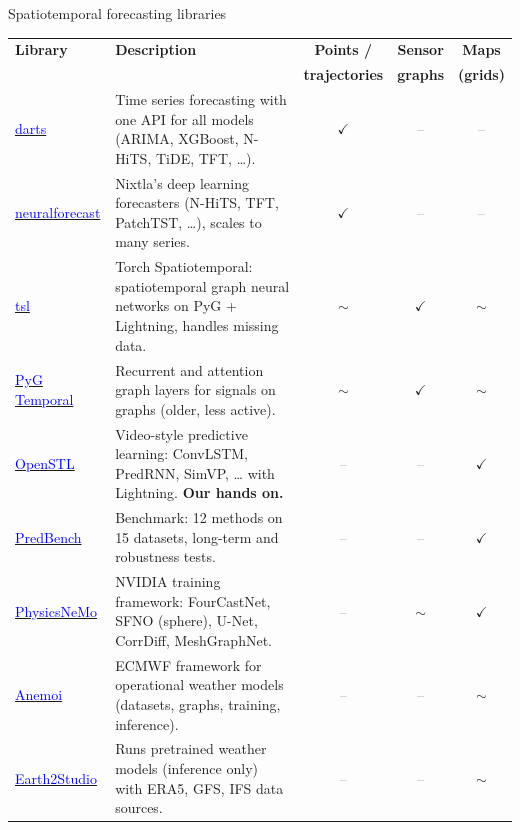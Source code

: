 \documentclass{beamer}
\begin{document}
\begin{frame}{Spatiotemporal forecasting libraries}
    \newcommand{\libyes}{\textcolor{green!50!black}{$\checkmark$}}
    \newcommand{\libpart}{\textcolor{orange!90!black}{$\sim$}}
    \newcommand{\libno}{\textcolor{gray}{--}}
    \centering
    \tiny
    \renewcommand{\arraystretch}{1.2}
    \begin{tabularx}{\textwidth}{@{}l >{\raggedright\arraybackslash}X c c c@{}}
        \toprule
        \textbf{Library} & \textbf{Description} & \textbf{Points /} & \textbf{Sensor} & \textbf{Maps} \\
        & & \textbf{trajectories} & \textbf{graphs} & \textbf{(grids)} \\
        \midrule
        \href{https://github.com/unit8co/darts}{\textcolor{blue}{darts}} & Time series forecasting with one API for all models (ARIMA, XGBoost, N-HiTS, TiDE, TFT, \dots). & \libyes & \libno & \libno \\
        \href{https://github.com/Nixtla/neuralforecast}{\textcolor{blue}{neuralforecast}} & Nixtla's deep learning forecasters (N-HiTS, TFT, PatchTST, \dots), scales to many series. & \libyes & \libno & \libno \\
        \href{https://github.com/TorchSpatiotemporal/tsl}{\textcolor{blue}{tsl}} & Torch Spatiotemporal: spatiotemporal graph neural networks on PyG + Lightning, handles missing data. & \libpart & \libyes & \libpart \\
        \href{https://github.com/benedekrozemberczki/pytorch_geometric_temporal}{\textcolor{blue}{PyG Temporal}} & Recurrent and attention graph layers for signals on graphs (older, less active). & \libpart & \libyes & \libpart \\
        \midrule
        \href{https://github.com/chengtan9907/OpenSTL}{\textcolor{blue}{OpenSTL}} & Video-style predictive learning: ConvLSTM, PredRNN, SimVP, \dots{} with Lightning. \textbf{Our hands on.} & \libno & \libno & \libyes \\
        \href{https://github.com/OpenEarthLab/PredBench}{\textcolor{blue}{PredBench}} & Benchmark: 12 methods on 15 datasets, long-term and robustness tests. & \libno & \libno & \libyes \\
        \href{https://github.com/NVIDIA/physicsnemo}{\textcolor{blue}{PhysicsNeMo}} & NVIDIA training framework: FourCastNet, SFNO (sphere), U-Net, CorrDiff, MeshGraphNet. & \libno & \libpart & \libyes \\
        \href{https://github.com/ecmwf/anemoi-core}{\textcolor{blue}{Anemoi}} & ECMWF framework for operational weather models (datasets, graphs, training, inference). & \libno & \libno & \libpart \\
        \href{https://github.com/NVIDIA/earth2studio}{\textcolor{blue}{Earth2Studio}} & Runs pretrained weather models (inference only) with ERA5, GFS, IFS data sources. & \libno & \libno & \libpart \\
        \bottomrule
    \end{tabularx}


\end{frame}
\end{document}
